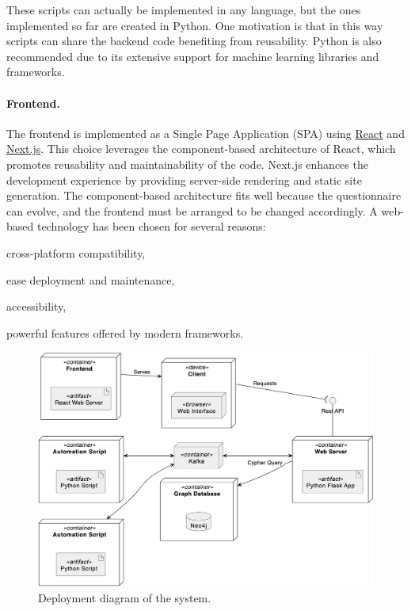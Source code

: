 \documentclass[12pt,a4paper,openright,twoside]{book}
\begin{document}
These scripts can actually be implemented in any language, but the ones implemented so far are created in Python.
%
One motivation is that in this way scripts can share the backend code benefiting from reusability.
Python is also recommended due to its extensive support for machine learning libraries and frameworks.



\paragraph{Frontend.}

The frontend is implemented as a Single Page Application (SPA) using \href{https://react.dev/}{React} and \href{https://nextjs.org/}{Next.js}.
%
This choice leverages the component-based architecture of React, which promotes reusability and maintainability of the code.
%
Next.js enhances the development experience by providing server-side rendering and static site generation.
%
The component-based architecture fits well because the questionnaire can evolve, and the frontend must be arranged to be changed accordingly.
%
A web-based technology has been chosen for several reasons:
\begin{enumerate*}[label=(\roman*)]
    \item cross-platform compatibility,
    \item ease deployment and maintenance,
    \item accessibility,
    \item powerful features offered by modern frameworks.
\end{enumerate*}



\begin{figure}
    \centering
    \includegraphics[width=\linewidth]{figures/diagrams/deployment.png}
    \caption{
        Deployment diagram of the system.
    }
    \label{fig:deployment}
\end{figure}
\end{document}
